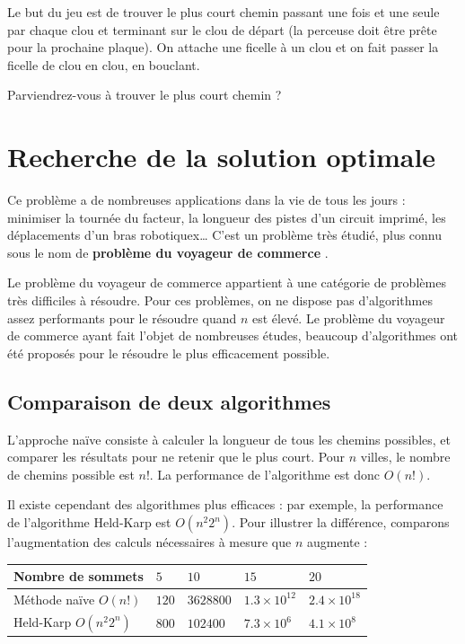Le but du jeu est de trouver le plus court chemin passant une fois et une seule
par chaque clou et terminant sur le clou de départ (la perceuse doit être prête
pour la prochaine plaque). On attache une ficelle à un clou et on fait passer la
ficelle de clou en clou, en bouclant.

\bigskip
Parviendrez-vous à trouver le plus court chemin ?

\newpage

\section*{Recherche de la solution optimale}

Ce problème a de nombreuses applications dans la vie de tous les jours :
minimiser la tournée du facteur, la longueur des pistes d'un circuit imprimé,
les déplacements d'un bras robotiquex{\ldots} C'est un problème très étudié,
plus connu sous le nom de \textbf{\og problème du voyageur de commerce \fg}.

Le problème du voyageur de commerce appartient à une catégorie de problèmes très
difficiles à résoudre. Pour ces problèmes, on ne dispose pas d'algorithmes assez
performants pour le résoudre quand $n$ est élevé. Le problème du voyageur de
commerce ayant fait l'objet de nombreuses études, beaucoup d'algorithmes ont été
proposés pour le résoudre le plus efficacement possible.

\subsection*{Comparaison de deux algorithmes}

L'approche naïve consiste à calculer la longueur de tous les chemins possibles,
et comparer les résultats pour ne retenir que le plus court. Pour $n$ villes, le
nombre de chemins possible est $n!$. La performance de l'algorithme est donc
$O(n!)$.

Il existe cependant des algorithmes plus efficaces : par exemple, la performance
de l'algorithme Held-Karp est $O(n^{2}2^n)$. Pour illustrer la différence,
comparons l'augmentation des calculs nécessaires à mesure que $n$ augmente :

\begin{center}
  \begin{tabular}{|l|llll|}
    \hline
    Nombre de sommets       & $5$   & $10$      & $15$            & $20$ \\
    \hline
    Méthode naïve $O(n!)$   & $120$ & $3628800$ & $1.3 \times 10^{12}$ & $2.4 \times 10^{18}$ \\
    Held-Karp $O(n^{2}2^n)$ & $800$ & $102400$  & $7.3 \times 10^6$       & $4.1 \times 10^8$ \\
    \hline
  \end{tabular} 
\end{center}

